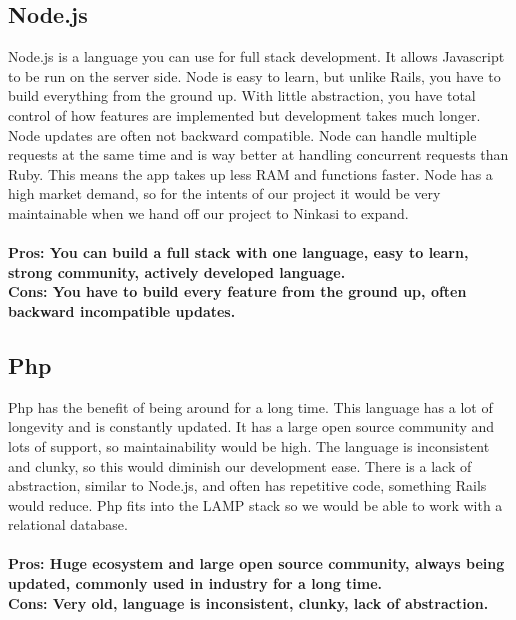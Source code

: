 \documentclass[draftclsnofoot,onecolumn,letterpaper,10pt,compsoc]{IEEEtran}
\begin{document}
	\subsection{Node.js}
			Node.js is a language you can use for full stack development\cite{Medium}.
			It allows Javascript to be run on the server side\cite{Medium}.
			Node is easy to learn, but unlike Rails, you have to build everything from the ground up\cite{NetGuru}.
			With little abstraction, you have total control of how features are implemented but development takes much longer.
			Node updates are often not backward compatible.
			Node can handle multiple requests at the same time and is way better at handling concurrent requests than Ruby\cite{Medium}.
			This means the app takes up less RAM and functions faster.
			Node has a high market demand, so for the intents of our project it would be very maintainable when we hand off our project to Ninkasi to expand.
			\\ \\
			\textbf{Pros: You can build a full stack with one language, easy to learn, strong community, actively developed language.}
			\\
			\textbf{Cons: You have to build every feature from the ground up, often backward incompatible updates.}

	\subsection{Php}
	Php has the benefit of being around for a long time\cite{InfoWorldPhp}.
	This language has a lot of longevity and is constantly updated. It has a large open source community and lots of support, so maintainability would be high\cite{Medium}.
	The language is inconsistent and clunky, so this would diminish our development ease.
	There is a lack of abstraction, similar to Node.js, and often has repetitive code\cite{RailsApps}, something Rails would reduce.
	Php fits into the LAMP stack so we would be able to work with a relational database.
		\\ \\
		\textbf{Pros: Huge ecosystem and large open source community, always being updated, commonly used in industry for a long time.}
		\\
		\textbf{Cons: Very old, language is inconsistent, clunky, lack of abstraction.}
\end{document}
